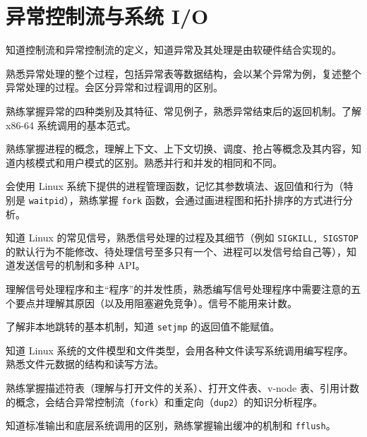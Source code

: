 \chapter{异常控制流与系统 I/O}
    \begin{summary}
        \begin{compactitem}
            \item 知道控制流和异常控制流的定义，知道异常及其处理是由软硬件结合实现的。
            \item 熟悉异常处理的整个过程，包括异常表等数据结构，会以某个异常为例，复述整个异常处理的过程。会区分异常和过程调用的区别。
            \item 熟练掌握异常的四种类别及其特征、常见例子，熟悉异常结束后的返回机制。了解 x86-64 系统调用的基本范式。
            \item 熟练掌握进程的概念，理解上下文、上下文切换、调度、抢占等概念及其内容，知道内核模式和用户模式的区别。熟悉并行和并发的相同和不同。
            \item 会使用 Linux 系统下提供的进程管理函数，记忆其参数填法、返回值和行为（特别是 \verb|waitpid|），熟练掌握 \verb|fork| 函数，会通过画进程图和拓扑排序的方式进行分析。
            \item 知道 Linux 的常见信号，熟悉信号处理的过程及其细节（例如 \verb|SIGKILL, SIGSTOP| 的默认行为不能修改、待处理信号至多只有一个、进程可以发信号给自己等），知道发送信号的机制和多种 API。
            \item 理解信号处理程序和主“程序”的并发性质，熟悉编写信号处理程序中需要注意的五个要点并理解其原因（以及用阻塞避免竞争）。信号不能用来计数。
            \item 了解非本地跳转的基本机制，知道 \verb|setjmp| 的返回值不能赋值。
            \item 知道 Linux 系统的文件模型和文件类型，会用各种文件读写系统调用编写程序。熟悉文件元数据的结构和读写方法。
            \item 熟练掌握描述符表（理解与打开文件的关系）、打开文件表、v-node 表、引用计数的概念，会结合异常控制流（\verb|fork|）和重定向（\verb|dup2|）的知识分析程序。
            \item 知道标准输出和底层系统调用的区别，熟练掌握输出缓冲的机制和 \verb|fflush|。
        \end{compactitem}
    \end{summary}

